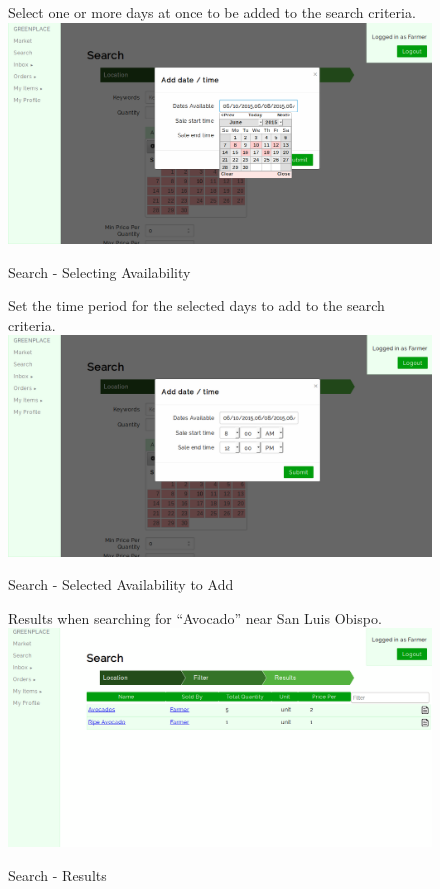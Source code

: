\documentclass[letterpaper, 10 pt, conference]{ieeeconf}  %
\begin{document}
\begin{figure}[H]
  \caption{Search - Selecting Availability}
  Select one or more days at once to be added to the search criteria.\\
  \label{fig:searchavailability}
  \centering
    \includegraphics[width=\textwidth]{images/selectmultipledates.png}
\end{figure}

\begin{figure}[H]
  \caption{Search - Selected Availability to Add}
  Set the time period for the selected days to add to the search criteria.\\
  \label{fig:selectedavailability}
  \centering
    \includegraphics[width=\textwidth]{images/search-availability.png}
\end{figure}

\begin{figure}[H]
  \caption{Search - Results}
  Results when searching for ``Avocado'' near San Luis Obispo.\\
  \label{fig:searchresults}
  \centering
    \includegraphics[width=\textwidth]{images/searchresults.png}
\end{figure}
\end{document}
